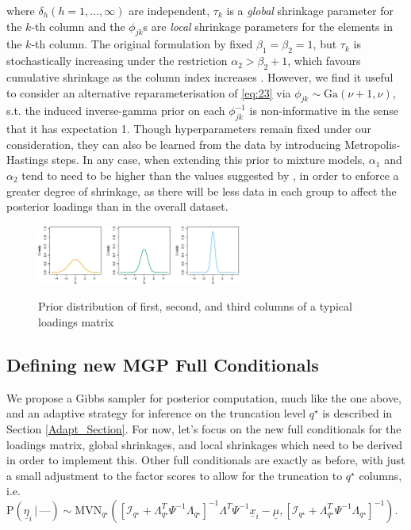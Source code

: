 \documentclass[a4paper,12pt,fleqn]{article}
\numberwithin{equation}{section}
\def\given{\,|\,}
\begin{document}
\noindent where $\delta_h \left(h=1,\ldots,\infty\right)$ are independent, $\tau_k$ is a \textit{global} shrinkage parameter for the $k$-th column and the $\phi_{jk}$s are \textit{local} shrinkage parameters for the elements in the $k$-th column. The original formulation by \citet{Bhattacharya2011} fixed $\beta_1 = \beta_2 = 1$, but $\tau_k$ is stochastically increasing under the restriction $\alpha_2 > \beta_2 + 1$, which favours cumulative shrinkage as the column index increases \citep{Durante2016}. However, we find it useful to consider an alternative reparameterisation of \eqref{eq:23} via $\phi_{jk}\sim\textrm{Ga}\left(\nu + 1, \nu\right)$, s.t. the induced inverse-gamma prior on each $\phi_{jk}^{-1}$ is non-informative in the sense that it has expectation 1. Though hyperparameters remain fixed under our consideration, they can also be learned from the data by introducing Metropolis-Hastings steps. In any case, when extending this prior to mixture models, $\alpha_1$ and $\alpha_2$ tend to need to be higher than the values suggested by \citet{Bhattacharya2011}, in order to enforce a greater degree of shrinkage, as there will be less data in each group to affect the posterior loadings than in the overall dataset.

\begin{figure}[h]
	\centering
	\caption{Prior distribution of first, second, and third columns of a typical loadings matrix}
	\includegraphics[width=0.6\textwidth, keepaspectratio]{Priors}
	\label{PriorPlot}
\end{figure}

\subsection[Defining new MGP Full Conditionals]{Defining new MGP Full Conditionals}
We propose a Gibbs sampler for posterior computation, much like the one above, and an adaptive strategy for inference on the truncation level $q^\star$ is described in Section \ref{Adapt_Section}. For now, let's focus on the new full conditionals for the loadings matrix, global shrinkages, and local shrinkages which need to be derived in order to implement this. Other full conditionals are exactly as before, with just a small adjustment to the factor scores to allow for the truncation to $q^\star$ columns, i.e. $\mathrm{P}\left(\underline{\eta}_i \given \mbox{---}\right) \sim  \textrm{MVN}_{q^\star}\left(\left[\mathcal{I}_{q^\star} + \Lambda^T_{q^\star}\Psi^{-1}\Lambda_{q^\star}\right]^{-1}\Lambda^T\Psi^{-1}\underline{x}_i - \underline{\mu},\left[\mathcal{I}_{q^\star} + \Lambda^T_{q^\star}\Psi^{-1}\Lambda_{q^\star}\right]^{-1}\right)$.
\end{document}
